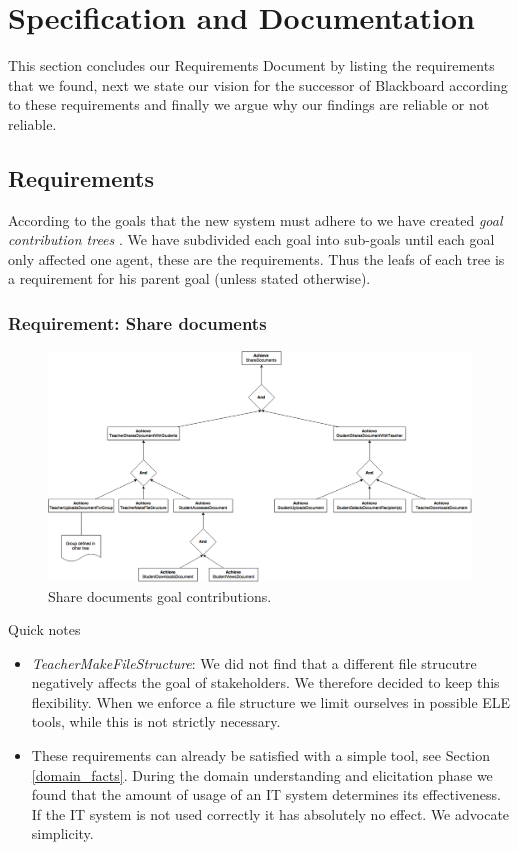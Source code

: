 \chapter{Specification and Documentation}
This section concludes our Requirements Document by listing the requirements that we found, next we state our vision for the successor of Blackboard according to these requirements and finally we argue why our findings are reliable or not reliable.

\section{Requirements}
According to the goals that the new system must adhere to we have created \emph{goal contribution trees} \cite{RE_book}. We have subdivided each goal into sub-goals until each goal only affected one agent, these are the requirements. Thus the leafs of each tree is a requirement for his parent goal (unless stated otherwise).
\subsection{Requirement: Share documents}
\begin{figure}[h!]
	\centering
	\includegraphics[width=1\linewidth]{images/ShareDocuments.png}
	\caption{Share documents goal contributions.}
	\label{fig:goal_share_documents}
\end{figure}

Quick notes\\
\begin{itemize}
	\item \textit{TeacherMakeFileStructure}: We did not find that a different file strucutre negatively affects the goal of stakeholders. We therefore decided to keep this flexibility. When we enforce a file structure we limit ourselves in possible ELE tools, while this is not strictly necessary.
	\item These requirements can already be satisfied with a simple tool, see Section \ref{domain_facts}. During the domain understanding and elicitation phase we found that the amount of usage of an IT system determines its effectiveness. If the IT system is not used correctly it has absolutely no effect. We advocate simplicity.
\end{itemize}

